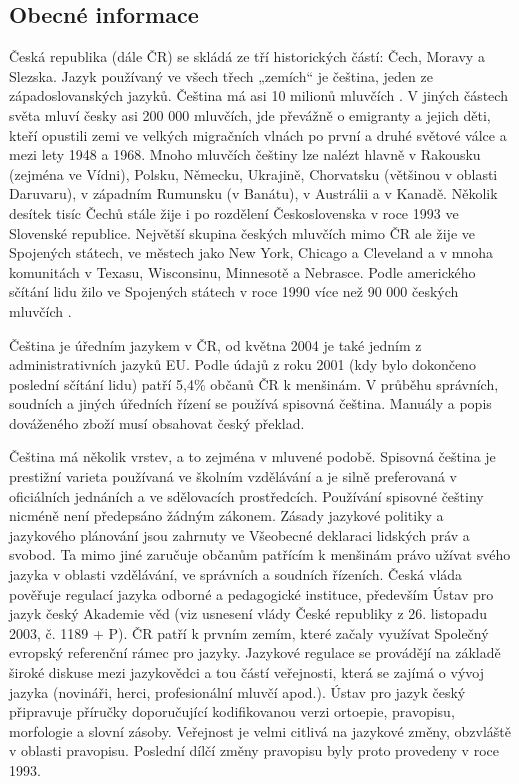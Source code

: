 
\begin{multicols}{2}
  \subsection{Obecné informace}

Česká republika (dále ČR) se skládá ze tří historických částí: Čech, Moravy a Slezska. Jazyk používaný ve všech třech „zemích“ je čeština, jeden ze západoslovanských jazyků. Čeština má asi 10 milionů mluvčích \cite{Note1}. V jiných částech světa mluví česky asi 200 000 mluvčích, jde převážně o emigranty a jejich děti, kteří opustili zemi ve velkých migračních vlnách po první a druhé světové válce a mezi lety 1948 a 1968. Mnoho mluvčích češtiny lze nalézt hlavně v Rakousku (zejména ve Vídni), Polsku, Německu, Ukrajině, Chorvatsku (většinou v oblasti Daruvaru), v západním Rumunsku (v Banátu), v Austrálii a v Kanadě. Několik desítek tisíc Čechů stále žije i po rozdělení Československa v roce 1993 ve Slovenské republice. Největší skupina českých mluvčích mimo ČR ale žije ve Spojených státech, ve městech jako New York, Chicago a Cleveland a v mnoha komunitách v Texasu, Wisconsinu, Minnesotě a Nebrasce. Podle amerického sčítání lidu žilo ve Spojených státech v roce 1990 více než 90 000 českých mluvčích \cite{Note2}.

Čeština je úředním jazykem v ČR, od května 2004 je také jedním z administrativních jazyků EU. Podle údajů z roku 2001 (kdy bylo dokončeno poslední sčítání lidu) patří 5,4\% občanů ČR k menšinám. V průběhu správních, soudních a jiných úředních řízení se používá spisovná čeština. Manuály a popis dováženého zboží musí obsahovat český překlad.

Čeština má několik vrstev, a to zejména v mluvené podobě. Spisovná čeština je prestižní varieta používaná ve školním vzdělávání a je silně preferovaná v oficiálních jednáních a ve sdělovacích prostředcích. Používání spisovné češtiny nicméně není předepsáno žádným zákonem. Zásady jazykové politiky a jazykového plánování jsou zahrnuty ve Všeobecné deklaraci lidských práv a svobod. Ta mimo jiné zaručuje občanům patřícím k menšinám právo užívat svého jazyka v oblasti vzdělávání, ve správních a soudních řízeních. Česká vláda pověřuje regulací jazyka odborné a pedagogické instituce, především Ústav pro jazyk český Akademie věd (viz usnesení vlády České republiky z 26. listopadu 2003, č. 1189 + P). ČR patří k prvním zemím, které začaly využívat Společný evropský referenční rámec pro jazyky. Jazykové regulace se provádějí na základě široké diskuse mezi jazykovědci a tou částí veřejnosti, která se zajímá o vývoj jazyka (novináři, herci, profesionální mluvčí apod.). Ústav pro jazyk český připravuje příručky doporučující kodifikovanou verzi ortoepie, pravopisu, morfologie a slovní zásoby. Veřejnost je velmi citlivá na jazykové změny, obzvláště v oblasti pravopisu. Poslední dílčí změny pravopisu byly proto provedeny v roce 1993.


\end{multicols}
